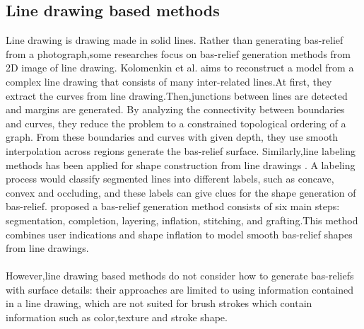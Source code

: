 \subsection{Line drawing based methods}
Line drawing is drawing made in solid lines. Rather than generating bas-relief from a photograph,some researches focus on bas-relief generation methods from 2D image of line drawing.
Kolomenkin et al.\cite{kolomenkin2011reconstruction}  aims to reconstruct a model from a complex line drawing that consists of many inter-related lines.At first, they extract the curves from line drawing.Then,junctions between lines are detected and margins are generated. By analyzing the connectivity between boundaries and curves, they reduce the problem to a constrained topological ordering of a graph. From these boundaries and curves with given depth, they use smooth interpolation across regions generate the bas-relief surface. Similarly,line labeling methods has been applied for shape construction from line drawings  \cite{varley2002estimating}\cite{malik1987interpreting}\cite{sykora2014ink}. A labeling process would classify segmented lines into different labels, such as concave, convex and occluding, and these labels can give clues for the shape generation of bas-relief. 
\cite{sykora2014ink} proposed a bas-relief generation method consists of six main steps: segmentation, completion, layering, inflation, stitching, and grafting.This method combines user indications and shape inflation to model smooth bas-relief shapes from line drawings. \\ \\ 
However,line drawing based methods do not consider how to generate bas-reliefs with surface details: their approaches are limited to using information contained in a line drawing, which are not suited for brush strokes which contain information such as color,texture and stroke shape. 


